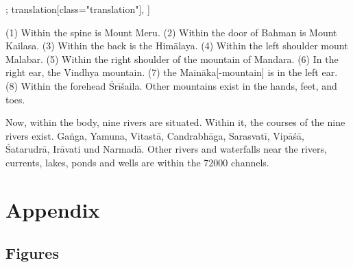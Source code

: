\begin{alignment}[
  texts=edition[class="edition"];
  translation[class="translation"],
  ]
\begin{translation}
\begin{tlate}
(1) Within the spine is Mount Meru. (2) Within the door of Bahman is Mount Kailasa. (3) Within the back is the Himālaya. (4) Within the left shoulder mount Malabar. (5) Within the right shoulder of the mountain of Mandara. (6) In the right ear, the Vindhya mountain. (7) the Maināka[-mountain] is in the left ear. (8) Within the forehead Śrīśaila. Other mountains exist in the hands, feet, and toes.
\end{tlate}
\begin{tlate}
  Now, within the body, nine rivers are situated. Within it, the courses of the nine rivers exist. Gaṅga, Yamuna, Vitastā, Candrabhāga, Sarasvatī, Vipāśā, Śatarudrā, Irāvati und Narmadā. Other rivers and waterfalls near the rivers, currents, lakes, ponds and wells are within the 72000 channels.
  \flushpage
\end{tlate}
  \end{translation}
\end{alignment}
\pagebreak %

\chapter{Appendix}
\section{Figures}

